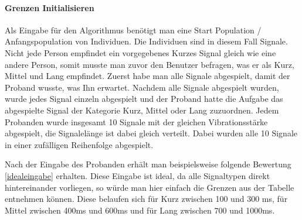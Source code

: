 
\paragraph{Grenzen Initialisieren}
Als Eingabe f{\"u}r den Algorithmus ben{\"o}tigt man eine Start Population / Anfangspopulation von Individuen. Die Individuen sind in diesem Fall Signale. 
Nicht jede Person empfindet ein vorgegebenes Kurzes Signal gleich wie eine andere Person, somit musste man zuvor den Benutzer befragen, was er als Kurz, Mittel und Lang empfindet. Zuerst habe man alle Signale abgespielt, damit der Proband wusste, was Ihn erwartet. 
Nachdem alle Signale abgespielt wurden, wurde jedes Signal einzeln abgespielt und der Proband hatte die Aufgabe das abgespielte Signal der Kategorie Kurz, Mittel oder Lang zuzuordnen. 
Jedem Probanden wurde insgesamt 10 Signale mit der gleichen Vibrationsst{\"a}rke abgespielt, die Signalel{\"a}nge ist dabei gleich verteilt.
Dabei wurden alle 10 Signale in einer zuf{\"a}lligen Reihenfolge abgespielt.

Nach der Eingabe des Probanden erh{\"a}lt man beispielsweise folgende Bewertung \autoref{idealeingabe} erhalten. Diese Eingabe ist ideal, da alle Signaltypen direkt hintereinander vorliegen, so w{\"u}rde man hier einfach die Grenzen aus der Tabelle entnehmen k{\"o}nnen. Diese belaufen sich f{\"u}r Kurz zwischen 100 und 300 ms, f{\"u}r Mittel zwischen 400ms und 600ms und f{\"u}r Lang zwischen 700 und 1000ms.

\begin{table}[]
\centering
\caption{Bewertung eines Probanden die Ideal ist. Dabei ist die \textit{L{\"a}nge} die Signall{\"a}nge in ms und \textit{Erkannt} ist das erkannte Signal durch dem Benutzer }
\label{idealeingabe}
\end{table}


